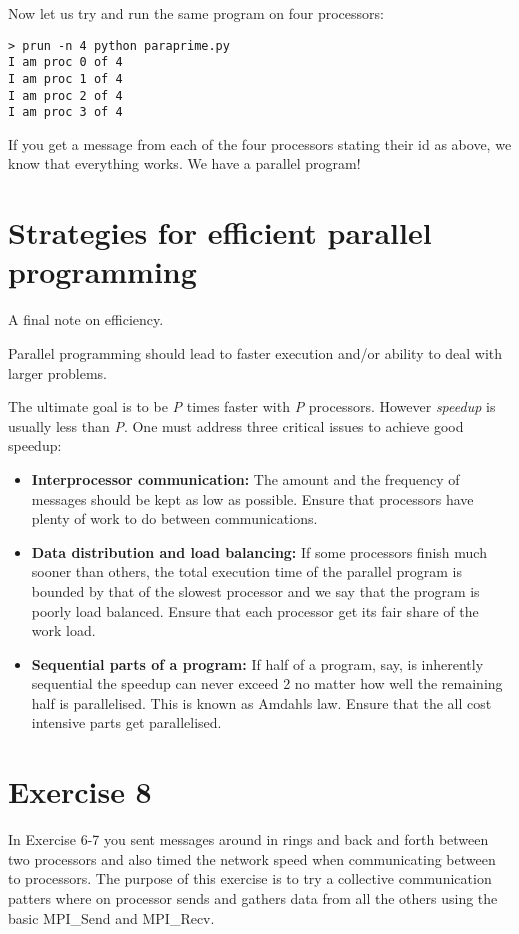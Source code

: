 \documentclass[12pt]{article}
\begin{document}
\noindent Now let us try and run the same program on four processors:
{\small \begin{verbatim}
> prun -n 4 python paraprime.py
I am proc 0 of 4
I am proc 1 of 4
I am proc 2 of 4
I am proc 3 of 4
\end{verbatim}}
If you get a message from each of the four processors stating their
id as above, we know that everything works. We have a parallel program!

\section{Strategies for efficient parallel programming}
A final note on efficiency.

Parallel programming should lead to faster execution and/or
ability to deal with larger problems.

The ultimate goal is to be \emph{P} times faster with \emph{P} processors.
However \emph{speedup} is usually less than \emph{P}. One must address
three critical issues to achieve good speedup:
\begin{itemize}
  \item \textbf{Interprocessor communication:} The amount and the frequency
  of messages should be kept as low as possible. Ensure that processors
  have plenty of work to do between communications.
  \item \textbf{Data distribution and load balancing:} If some processors
  finish much sooner than others, the total execution time of the parallel
  program is bounded by that of the slowest processor and we say that the
  program is poorly load balanced.
  Ensure that each processor get its fair share of the work load.
  \item \textbf{Sequential parts of a program:} If half of a program, say, is
  inherently sequential the speedup can never exceed 2 no matter how well
  the remaining half is parallelised. This is known as Amdahls law.
  Ensure that the all cost intensive parts get parallelised.
\end{itemize}





\section*{Exercise 8}

In Exercise 6-7 you sent messages around in rings and back and forth between 
two processors and also timed the network speed when communicating between to
processors.
The purpose of this exercise is to try a collective communication patters
where on processor sends and gathers data from all the others using the 
basic MPI\_Send and MPI\_Recv.
\end{document}
